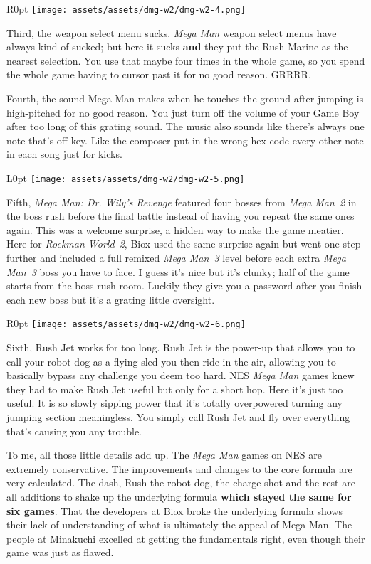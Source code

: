 \documentclass{book}
\begin{document}
\begin{wrapfigure}{R}{0pt} \texttt{[image: assets/assets/dmg-w2/dmg-w2-4.png]}\end{wrapfigure}
Third, the weapon select menu sucks. \emph{Mega Man} weapon select menus have always kind of sucked; but here it sucks \textbf{and} they put the Rush Marine as the nearest selection. You use that maybe four times in the whole game, so you spend the whole game having to cursor past it for no good reason. GRRRR.

Fourth, the sound Mega Man makes when he touches the ground after jumping is high-pitched for no good reason. You just turn off the volume of your Game Boy after too long of this grating sound. The music also sounds like there’s always one note that’s off-key. Like the composer put in the wrong hex code every other note in each song just for kicks.

\begin{wrapfigure}{L}{0pt} \texttt{[image: assets/assets/dmg-w2/dmg-w2-5.png]}\end{wrapfigure}
Fifth, \emph{Mega Man: Dr. Wily’s Revenge} featured four bosses from \emph{Mega Man~2} in the boss rush before the final battle instead of having you repeat the same ones again. This was a welcome surprise, a hidden way to make the game meatier. Here for \emph{Rockman World~2}, Biox used the same surprise again but went one step further and included a full remixed \emph{Mega Man~3} level before each extra \emph{Mega Man~3} boss you have to face. I guess it’s nice but it’s clunky; half of the game starts from the boss rush room. Luckily they give you a password after you finish each new boss but it’s a grating little oversight.

\begin{wrapfigure}{R}{0pt} \texttt{[image: assets/assets/dmg-w2/dmg-w2-6.png]}\end{wrapfigure}
Sixth, Rush Jet works for too long. Rush Jet is the power-up that allows you to call your robot dog as a flying sled you then ride in the air, allowing you to basically bypass any challenge you deem too hard. NES \emph{Mega Man} games knew they had to make Rush Jet useful but only for a short hop. Here it’s just too useful. It is so slowly sipping power that it’s totally overpowered turning any jumping section meaningless. You simply call Rush Jet and fly over everything that’s causing you any trouble.

To me, all those little details add up. The \emph{Mega Man} games on NES are extremely conservative. The improvements and changes to the core formula are very calculated. The dash, Rush the robot dog, the charge shot and the rest are all additions to shake up the underlying formula \textbf{which stayed the same for six games}. That the developers at Biox broke the underlying formula shows their lack of understanding of what is ultimately the appeal of Mega Man. The people at Minakuchi excelled at getting the fundamentals right, even though their game was just as flawed.
\end{document}
